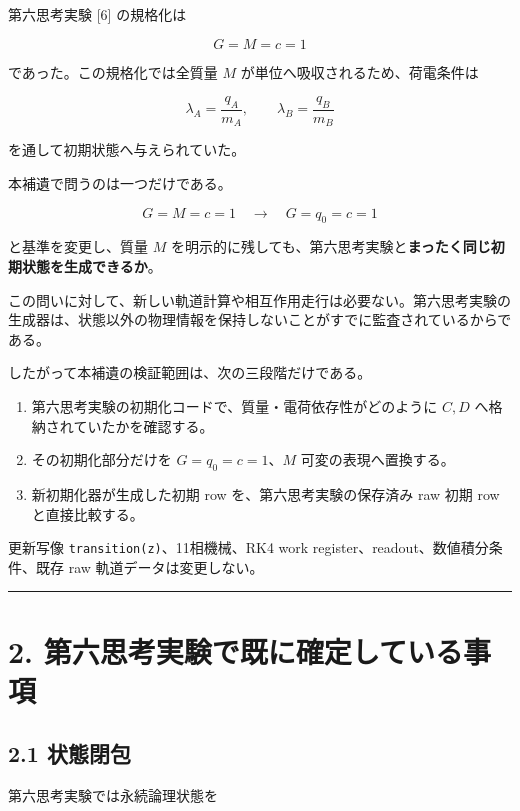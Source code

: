 \documentclass[
  a4paper,
]{ltjsarticle}
\providecommand{\tightlist}{%
  \setlength{\itemsep}{0pt}\setlength{\parskip}{0pt}}
\begin{document}
第六思考実験 {[}6{]} の規格化は

\[
G=M=c=1
\]

であった。この規格化では全質量 \(M\) が単位へ吸収されるため、荷電条件は

\[
\lambda_A=\frac{q_A}{m_A},\qquad
\lambda_B=\frac{q_B}{m_B}
\]

を通して初期状態へ与えられていた。

本補遺で問うのは一つだけである。

\[
\boxed{
G=M=c=1
\quad\longrightarrow\quad
G=q_0=c=1
}
\]

と基準を変更し、質量 \(M\)
を明示的に残しても、第六思考実験と\textbf{まったく同じ初期状態を生成できるか}。

この問いに対して、新しい軌道計算や相互作用走行は必要ない。第六思考実験の生成器は、状態以外の物理情報を保持しないことがすでに監査されているからである。

したがって本補遺の検証範囲は、次の三段階だけである。

\begin{enumerate}
\def\labelenumi{\arabic{enumi}.}
\tightlist
\item
  第六思考実験の初期化コードで、質量・電荷依存性がどのように \(C,D\)
  へ格納されていたかを確認する。
\item
  その初期化部分だけを \(G=q_0=c=1\)、\(M\) 可変の表現へ置換する。
\item
  新初期化器が生成した初期 row を、第六思考実験の保存済み raw 初期 row
  と直接比較する。
\end{enumerate}

更新写像 \texttt{transition(z)}、11相機械、RK4 work
register、readout、数値積分条件、既存 raw 軌道データは変更しない。

\begin{center}\rule{0.5\linewidth}{0.5pt}\end{center}

\section{2.
第六思考実験で既に確定している事項}\label{ux7b2cux516dux601dux8003ux5b9fux9a13ux3067ux65e2ux306bux78baux5b9aux3057ux3066ux3044ux308bux4e8bux9805}

\subsection{2.1 状態閉包}\label{ux72b6ux614bux9589ux5305}

第六思考実験では永続論理状態を
\end{document}
